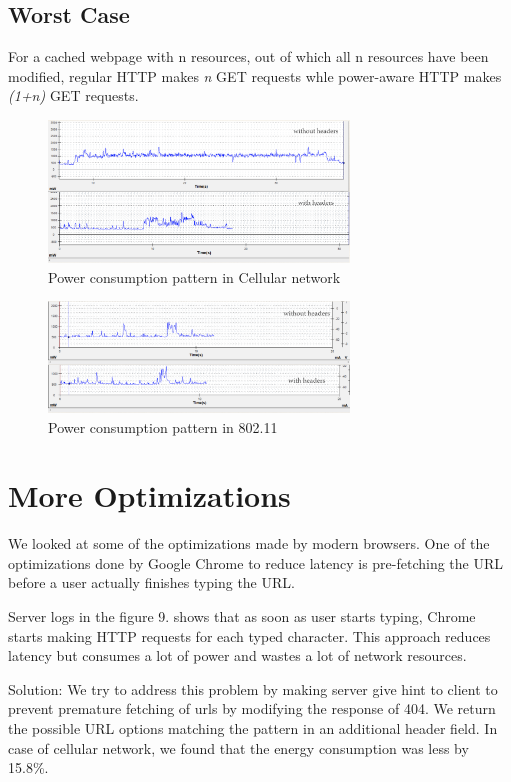\documentclass{sigplanconf}
\begin{document}
\subsection{Worst Case}

For a cached webpage with n resources, out of which all n resources have been modified, regular HTTP
makes {\it n} GET requests whle power-aware HTTP makes {\it (1+n)} GET requests.



\begin{figure}[ht!]
\centering
\includegraphics[width=80mm]{Cellular_combined.png}
\caption{Power consumption pattern in Cellular network }
\label{fig:sp_gd_mnist}
\end{figure}

\begin{figure}[ht!]	
\centering
\includegraphics[width=80mm]{Wifi_combined.png}
\caption{Power consumption pattern in 802.11}
\label{fig:sp_gd_mnist}
\end{figure}



\section{More Optimizations}

We looked at some of the optimizations made by modern browsers. One of the optimizations done by Google Chrome to reduce latency is pre-fetching the URL before a user actually finishes typing the URL.
 
Server logs in the figure 9. shows that as soon as user starts typing, Chrome starts making HTTP requests for each typed character. This approach reduces latency but consumes a lot of power and wastes a lot of network resources. 

Solution: We try to address this problem by making server give hint to client to prevent premature fetching of urls by modifying the response of 404. We return the possible URL options matching the pattern in an additional header field. In case of cellular network, we found that the energy consumption was less by 15.8\%.
\end{document}
